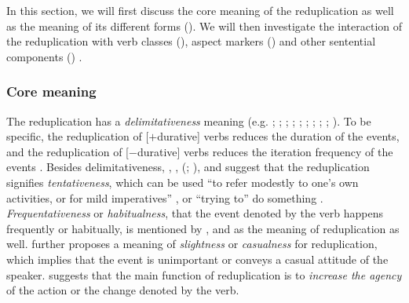 In this section, we will first discuss the core meaning of the reduplication as well as the meaning of its different forms ().
We will then investigate the interaction of the reduplication with verb classes (), aspect markers () and other sentential components () .

\subsubsection{Core meaning}\label{sec:core-sem}

The reduplication has a \textit{delimitativeness} meaning (e.g. \citealt[204--205]{Chao1968}; \citealt[232]{LiThompson1981};  \citealt[14]{Li1996}; \citealt[70]{Dai1997};  \citealt[382--383]{Zhu1998}; \citealt[420--421]{Xing2000}; \citealt[48]{Chen2001};  \citealt[288]{Tsao2001}; \citealt[11--12]{Yang2003}; \citealt[Sec. 4.3]{XiaoMcEnery2004}). 
To be specific, the reduplication of [$+$durative] verbs reduces the duration of the events,
and the reduplication of [$-$durative] verbs reduces the iteration frequency of the events \citetext{\citealp[14]{Li1996}; \citealp[149--150]{XiaoMcEnery2004}}.
Besides delimitativeness, \citet[204]{Chao1968}, \citet[276]{Fan1964}, \citeauthor{Smith1991} (\citeyear[356]{Smith1991}; \citeyear[199--120]{Smith1994}), \citet[14]{Li1996} and \citet[290--291]{Tsao2001} suggest that the reduplication signifies \textit{tentativeness}, which can be used
``to refer modestly to one's own activities, or for mild imperatives'' \citep[356]{Smith1991}, or ``trying to'' do something \citep[234]{LiThompson1981}.
\textit{Frequentativeness} or \textit{habitualness}, that the event denoted by the verb happens frequently or habitually, is mentioned by \citet[276]{Fan1964}, \citet[15]{Li1996} and \citet[1]{Qian2000} as the meaning of reduplication as well.
 \citet[276]{Fan1964} further proposes a meaning of \textit{slightness} or \textit{casualness} for reduplication, which implies that the event is unimportant or conveys a casual attitude of the speaker.
 \citet[Sec. 3.1.3]{Zhu1998} suggests that the main function of reduplication is to \textit{increase the agency} of the action or the change denoted by the verb.


